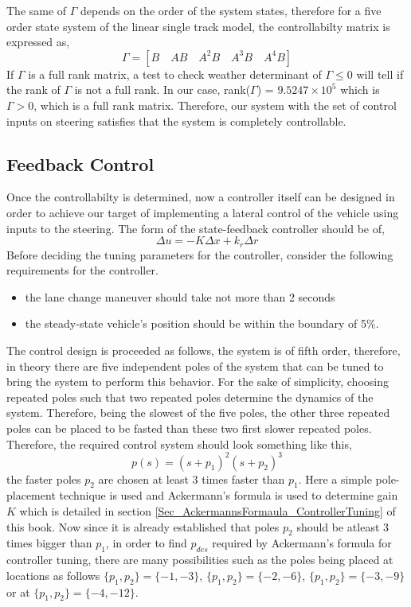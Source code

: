 The same of $\Gamma$ depends on the order of the system states, therefore for a five order state system of the linear single track model, the controllabilty matrix is expressed as,
\begin{equation}
	\Gamma = [B \quad AB \quad A^2 B \quad A^3 B \quad A^4 B]
\end{equation}
If $\Gamma$ is a full rank matrix, a test to check weather determinant of $\Gamma \leq 0$ will tell if the rank of $\Gamma$ is not a full rank. In our case, rank($\Gamma$) = $9.5247\times10^5$ which is $\Gamma > 0$, which is a full rank matrix. Therefore, our system with the set of control inputs on steering satisfies that the system is completely controllable. 

\subsection{Feedback Control}

Once the controllabilty is determined, now a controller itself can be designed in order to achieve our target of implementing a lateral control of the vehicle using inputs to the steering. The form of the state-feedback controller should be of,
\begin{equation}
	\Delta u = - K \Delta x + k_r \Delta r
\end{equation}
Before deciding the tuning parameters for the controller, consider the following requirements for the controller.
\begin{itemize}
	\item the lane change maneuver should take not more than 2 seconds
	\item the steady-state vehicle's position should be within the boundary of 5$\%$.
\end{itemize}

The control design is proceeded as follows, the system is of fifth order, therefore, in theory there are five independent poles of the system that can be tuned to bring the system to perform this behavior. For the sake of simplicity, choosing repeated poles such that two repeated poles determine the dynamics of the system. Therefore, being the slowest of the five poles, the other three repeated poles can be placed to be fasted than these two first slower repeated poles. Therefore, the required control system should look something like this,
\begin{equation}
	p(s) = (s + p_1)^2 (s + p_2)^3
\end{equation}
the faster poles $p_2$ are chosen at least 3 times faster than $p_1$. Here a simple pole-placement technique is used and Ackermann's formula is used to determine gain $K$ which is detailed in section \ref{Sec_AckermannsFormaula_ControllerTuning} of this book. Now since it is already established that poles $p_2$ should be atleast 3 times bigger than $p_1$, in order to find $p_{des}$ required by Ackermann's formula for controller tuning, there are many possibilities such as the poles being placed at locations as follows $\{p_1, p_2\} = \{ -1,-3 \}$, $\{p_1, p_2\} = \{ -2,-6 \}$, $\{p_1, p_2\} = \{ -3,-9 \}$ or at $\{p_1, p_2\} = \{ -4,-12 \}$. 







